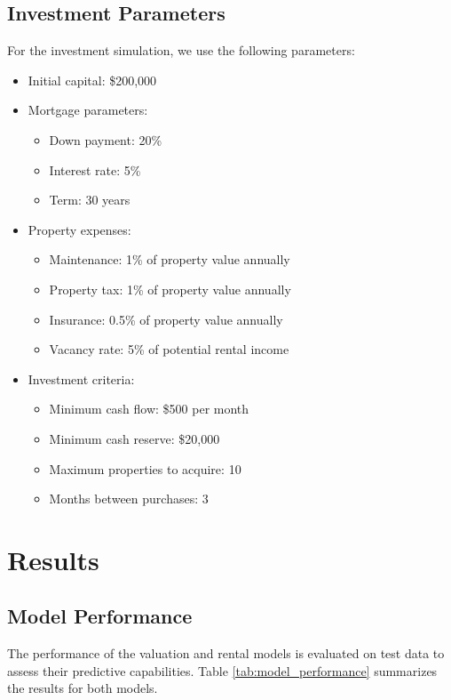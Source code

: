 \documentclass[conference]{IEEEtran}
\begin{document}
\subsection{Investment Parameters}
For the investment simulation, we use the following parameters:

\begin{itemize}
\item Initial capital: \$200,000
\item Mortgage parameters:
  \begin{itemize}
  \item Down payment: 20\%
  \item Interest rate: 5\%
  \item Term: 30 years
  \end{itemize}
\item Property expenses:
  \begin{itemize}
  \item Maintenance: 1\% of property value annually
  \item Property tax: 1\% of property value annually
  \item Insurance: 0.5\% of property value annually
  \item Vacancy rate: 5\% of potential rental income
  \end{itemize}
\item Investment criteria:
  \begin{itemize}
  \item Minimum cash flow: \$500 per month
  \item Minimum cash reserve: \$20,000
  \item Maximum properties to acquire: 10
  \item Months between purchases: 3
  \end{itemize}
\end{itemize}

\section{Results}

\subsection{Model Performance}
The performance of the valuation and rental models is evaluated on test data to assess their predictive capabilities. Table \ref{tab:model_performance} summarizes the results for both models.
\end{document}

